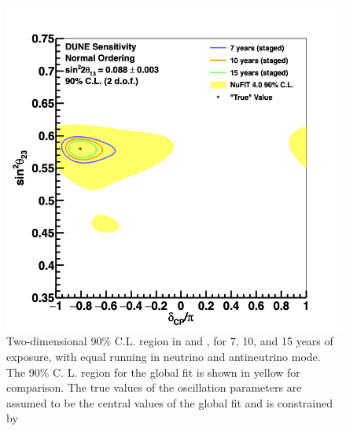 \begin{figure}[h!]
    \centering
		\includegraphics[width=0.95\linewidth]{graphics/bubbles_q23_asimov0_2019.png}
	\caption[Two-dimensional 90\% C.L. region in  and \deltacp]{Two-dimensional 90\% C.L. region in  and \deltacp, for 7, 10, and 15 years of exposure, with equal running in neutrino and antineutrino mode. The 90\% C. L. region for the  global fit is shown in yellow for comparison. The true values of the oscillation parameters are assumed to be the central values of the  global fit and  is constrained by }
    \label{fig:res_th23vdcp}
\end{figure}

